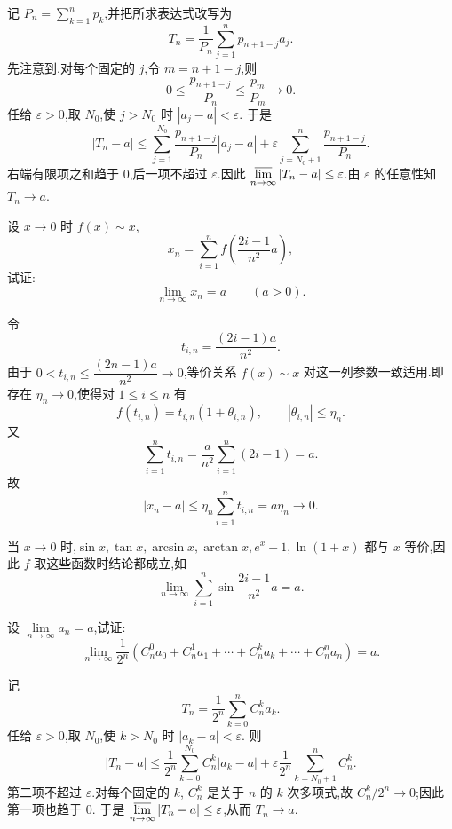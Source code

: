 \begin{solution}
  记 $P_n=\displaystyle \sum\limits_{k=1}^n p_k$,并把所求表达式改写为
  \[
    T_n=\dfrac{1}{P_n}\sum\limits_{j=1}^n p_{n+1-j}a_j.
  \]
  先注意到,对每个固定的 $j$,令 $m=n+1-j$,则
  \[
    0\leq\dfrac{p_{n+1-j}}{P_n}
    \leq\dfrac{p_m}{P_m}\longrightarrow0.
  \]
  任给 $\varepsilon>0$,取 $N_0$,使 $j>N_0$ 时 $|a_j-a|<\varepsilon$.
  于是
  \[
    |T_n-a|
    \leq \sum\limits_{j=1}^{N_0}
    \dfrac{p_{n+1-j}}{P_n}|a_j-a|
    +\varepsilon\sum\limits_{j=N_0+1}^{n}\dfrac{p_{n+1-j}}{P_n}.
  \]
  右端有限项之和趋于 $0$,后一项不超过 $\varepsilon$.因此
  $\varlimsup\limits_{n\to\infty}|T_n-a|\leq\varepsilon$.由 $\varepsilon$ 的任意性知 $T_n\to a$.
\end{solution}

\begin{example}
  设 $x\to0$ 时 $f(x)\sim x$,
  \[
    x_n=\sum\limits_{i=1}^n f\left(\dfrac{2i-1}{n^2}a\right),
  \]
  试证:
  \[
    \lim\limits_{n\to\infty}x_n=a\qquad(a>0).
  \]
\end{example}
\exampleblank

\begin{solution}
  令
  \[
    t_{i,n}=\dfrac{(2i-1)a}{n^2}.
  \]
  由于 $0<t_{i,n}\leq\dfrac{(2n-1)a}{n^2}\to0$,等价关系
  $f(x)\sim x$ 对这一列参数一致适用.即存在 $\eta_n\to0$,使得对
  $1\leq i\leq n$ 有
  \[
    f(t_{i,n})=t_{i,n}(1+\theta_{i,n}),
    \qquad |\theta_{i,n}|\leq\eta_n.
  \]
  又
  \[
    \sum\limits_{i=1}^n t_{i,n}
    =\dfrac{a}{n^2}\sum\limits_{i=1}^n(2i-1)=a.
  \]
  故
  \[
    |x_n-a|
    \leq\eta_n\sum\limits_{i=1}^n t_{i,n}
    =a\eta_n\longrightarrow0.
  \]
\end{solution}

\begin{remark}
  当 $x\to0$ 时,$\sin x,\tan x,\arcsin x,\arctan x,e^x-1,\ln(1+x)$ 都与 $x$ 等价,因此 $f$ 取这些函数时结论都成立,如
  \[
    \lim\limits_{n\to\infty}\sum\limits_{i=1}^n
    \sin\dfrac{2i-1}{n^2}a=a.
  \]
\end{remark}

\begin{example}
  设 $\displaystyle \lim\limits_{n\to\infty}a_n=a$,试证:
  \[
    \lim\limits_{n\to\infty}\dfrac{1}{2^n}
    \left(
    C_{n}^{0}a_0+C_{n}^{1}a_1+\cdots+C_{n}^{k}a_k+\cdots+C_{n}^{n}a_n
    \right)=a.
  \]
\end{example}
\exampleblank

\begin{solution}
  记
  \[
    T_n=\dfrac{1}{2^n}\sum\limits_{k=0}^n C_n^k a_k.
  \]
  任给 $\varepsilon>0$,取 $N_0$,使 $k>N_0$ 时 $|a_k-a|<\varepsilon$.
  则
  \[
    |T_n-a|
    \leq\dfrac{1}{2^n}\sum\limits_{k=0}^{N_0}C_n^k|a_k-a|
    +\varepsilon\dfrac{1}{2^n}\sum\limits_{k=N_0+1}^n C_n^k.
  \]
  第二项不超过 $\varepsilon$.对每个固定的 $k$,
  $C_n^k$ 是关于 $n$ 的 $k$ 次多项式,故 $C_n^k/2^n\to0$;因此第一项也趋于 $0$.
  于是 $\varlimsup\limits_{n\to\infty}|T_n-a|\leq\varepsilon$,从而 $T_n\to a$.
\end{solution}

